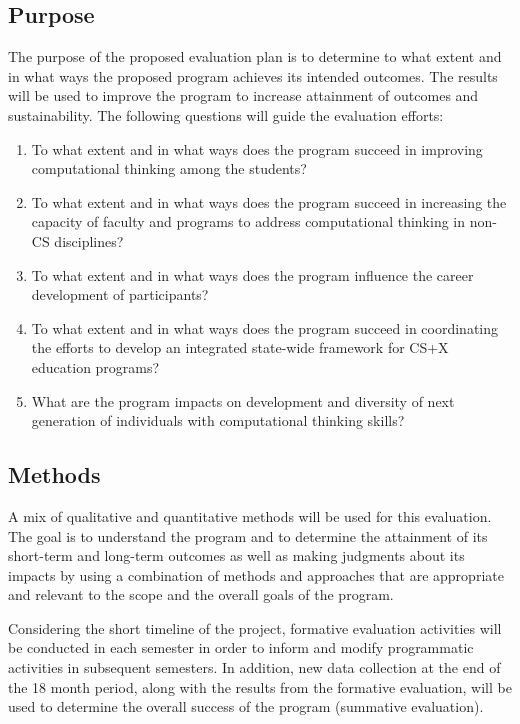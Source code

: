 \subsection{Purpose}
The purpose of the proposed evaluation plan is to determine to what extent and in what ways the proposed program achieves its intended outcomes. The results will be used to improve the program to increase attainment of outcomes and sustainability. The following questions will guide the evaluation efforts: 
\begin{enumerate}
\item To what extent and in what ways does the program succeed in improving computational thinking among the students? 
\item To what extent and in what ways does the program succeed in increasing the capacity of faculty and programs to address computational thinking in non-CS disciplines? 
\item To what extent and in what ways does the program influence the career development of participants?
\item To what extent and in what ways does the program succeed in coordinating the efforts to develop an integrated state-wide framework for CS+X education programs?
\item What are the program impacts on development and diversity of next generation of individuals with computational thinking skills?
\end{enumerate}

\subsection{Methods}
A mix of qualitative and quantitative methods will be used for this evaluation. The goal is to understand the program and to determine the attainment of its short-term and long-term outcomes as well as making judgments about its impacts by using a combination of methods and approaches that are appropriate and relevant to the scope and the overall goals of the program.    

Considering the short timeline of the project, formative evaluation activities will be conducted in each semester in order to inform and modify programmatic activities in subsequent semesters. In addition, new data collection at the end of the 18 month period, along with the results from the formative evaluation, will be used to determine the overall success of the program (summative evaluation). 

